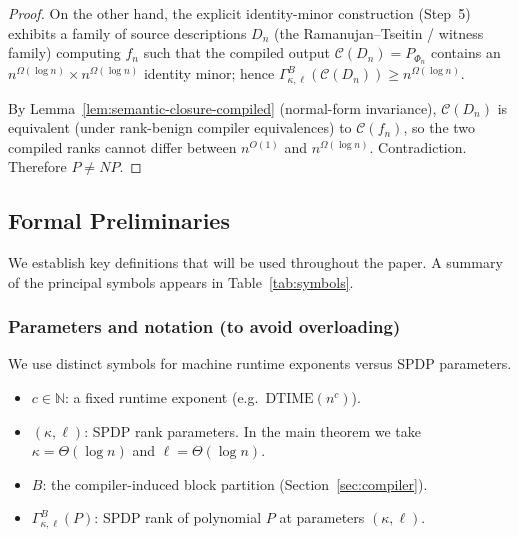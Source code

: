 \documentclass[12pt]{article}
\newcommand{\Comp}{\mathcal{C}}
\theoremstyle{definition}
\theoremstyle{definition}
\theoremstyle{remark}
\theoremstyle{remark}
\begin{document}
\begin{proof}
On the other hand, the explicit identity-minor construction (Step~5) exhibits a family of source
descriptions $D_n$ (the Ramanujan--Tseitin / witness family) computing $f_n$ such that the
compiled output $\Comp(D_n)=P_{\Phi_n}$ contains an $n^{\Omega(\log n)}\times n^{\Omega(\log n)}$
identity minor; hence $\Gamma^{B}_{\kappa,\ell}(\Comp(D_n))\ge n^{\Omega(\log n)}$.

By Lemma~\ref{lem:semantic-closure-compiled} (normal-form invariance), $\Comp(D_n)$ is
equivalent (under rank-benign compiler equivalences) to $\Comp(f_n)$, so the two compiled
ranks cannot differ between $n^{O(1)}$ and $n^{\Omega(\log n)}$.  Contradiction.
Therefore $P\neq NP$.
\end{proof}

\subsection{Formal Preliminaries}
\label{sec:preliminaries}

We establish key definitions that will be used throughout the paper. A summary of the principal symbols appears in Table~\ref{tab:symbols}.


\subsubsection{Parameters and notation (to avoid overloading)}
\label{sec:params-notation}

We use distinct symbols for machine runtime exponents versus SPDP parameters.

\begin{itemize}
\item $c \in \mathbb{N}$: a fixed runtime exponent (e.g.\ $\mathrm{DTIME}(n^{c})$).
\item $(\kappa,\ell)$: SPDP rank parameters.  In the main theorem we take
      $\kappa=\Theta(\log n)$ and $\ell=\Theta(\log n)$.
\item $B$: the compiler-induced block partition (Section~\ref{sec:compiler}).
\item $\Gamma^{B}_{\kappa,\ell}(P)$: SPDP rank of polynomial $P$ at parameters $(\kappa,\ell)$.
\end{itemize}
\end{document}
